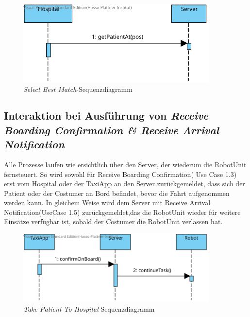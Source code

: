 \begin{figure}[H]
	\centering
	\includegraphics[width=0.9\textwidth]{img/2-Entwurf-RecieveOrder-Hosp.svg}
	\caption{\emph{Select Best Match}-Sequenzdiagramm}
	\label{SequenzDiagrammInteraktion}
\end{figure}



\subsection*{Interaktion bei Ausführung von \emph{Receive Boarding Confirmation \& Receive Arrival Notification}}

Alle Prozesse laufen wie ersichtlich über den Server, der wiederum die RobotUnit fernsteuert. 
So wird sowohl für Receive Boarding Confirmation( Use Case 1.3) erst vom Hospital oder der TaxiApp an den Server zurückgemeldet, dass sich der Patient oder der Costumer an Bord befindet, bevor die Fahrt aufgenommen werden kann. 
In gleichem Weise wird dem Server mit Receive Arrival Notification(UseCase 1.5) zurückgemeldet,das die RobotUnit wieder für weitere Einsätze verfügbar ist, sobald der Costumer die RobotUnit verlassen hat.  \\

\begin{figure}[H]
	\centering
	\includegraphics[width=0.9\textwidth]{img/2-Entwurf-ReceiveBoardingConfirmation-taxi.svg}
	\caption{\emph{Take Patient To Hospital}-Sequenzdiagramm}
	\label{SequenzDiagrammInteraktion}
\end{figure}

